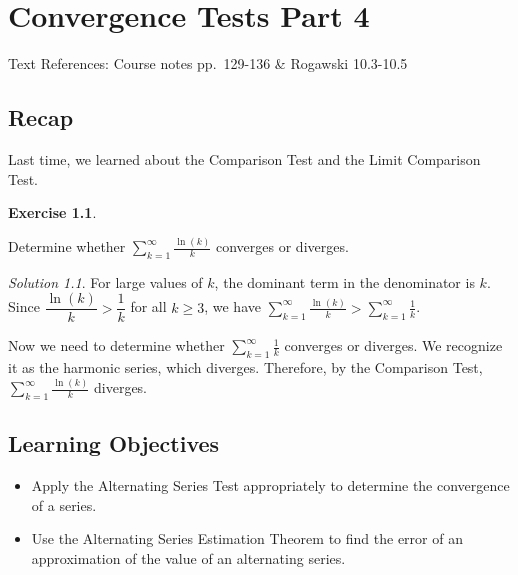 \documentclass[
]{book}
\providecommand{\tightlist}{%
  \setlength{\itemsep}{0pt}\setlength{\parskip}{0pt}}
\theoremstyle{definition}
\theoremstyle{definition}
\theoremstyle{definition}
\newtheorem{exercise}{Exercise}[chapter]
\theoremstyle{definition}
\theoremstyle{remark}
\newtheorem*{solution}{Solution}
\begin{document}
\hypertarget{lec-29}{%
\chapter{Convergence Tests Part 4}\label{lec-29}}

Text References: Course notes pp.~129-136 \& Rogawski 10.3-10.5

\hypertarget{recap-27}{%
\section{Recap}\label{recap-27}}

Last time, we learned about the Comparison Test and the Limit Comparison Test.

\begin{exercise}
\protect\hypertarget{exr:unlabeled-div-209}{}\label{exr:unlabeled-div-209}

Determine whether \(\displaystyle \sum_{k=1}^\infty \frac{\ln(k)}{k}\) converges or diverges.

\end{exercise}

\begin{solution}

For large values of \(k\), the dominant term in the denominator is \(k\). Since \(\dfrac{\ln(k)}{k}>\dfrac{1}{k}\) for all \(k\geq 3\), we have \(\displaystyle \sum_{k=1}^\infty \frac{\ln(k)}{k}> \displaystyle \sum_{k=1}^\infty \frac{1}{k}\).

Now we need to determine whether \(\displaystyle \sum_{k=1}^\infty \frac{1}{k}\) converges or diverges. We recognize it as the harmonic series, which diverges. Therefore, by the Comparison Test, \(\displaystyle \sum_{k=1}^\infty \frac{\ln(k)}{k}\) diverges.

\end{solution}

\hypertarget{learning-objectives-28}{%
\section{Learning Objectives}\label{learning-objectives-28}}

\begin{itemize}
\tightlist
\item
  Apply the Alternating Series Test appropriately to determine the convergence of a series.
\item
  Use the Alternating Series Estimation Theorem to find the error of an approximation of the value of an alternating series.
\end{itemize}
\end{document}
